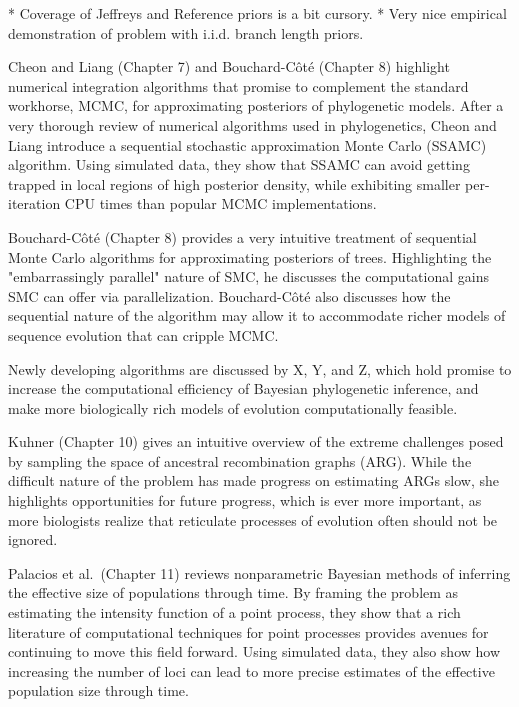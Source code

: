 \documentclass[letterpaper,12pt]{article}
\begin{document}
*   Coverage of Jeffreys and Reference priors is a bit cursory.
*   Very nice empirical demonstration of problem with i.i.d. branch length
    priors.




Cheon and Liang (Chapter 7) and Bouchard-C\^{o}t\'{e} (Chapter 8) highlight numerical
integration algorithms that promise to complement the standard workhorse, MCMC,
for approximating posteriors of phylogenetic models.
After a very thorough review of numerical algorithms used in phylogenetics,
Cheon and Liang introduce a sequential stochastic approximation Monte Carlo (SSAMC) \citep{Liang2007,Cheon2008}
algorithm.
Using simulated data, they show that SSAMC can avoid getting trapped in local
regions of high posterior density, while exhibiting smaller per-iteration CPU
times than popular MCMC implementations.

Bouchard-C\^{o}t\'{e} (Chapter 8) provides a very intuitive treatment of
sequential Monte Carlo algorithms for approximating posteriors of trees.
Highlighting the "embarrassingly parallel" nature of SMC, he discusses
the computational gains SMC can offer via parallelization.
Bouchard-C\^{o}t\'{e} also discusses how the sequential nature of the
algorithm may allow it to accommodate richer models of sequence evolution
that can cripple MCMC.

Newly developing algorithms are discussed by X, Y, and Z,
which hold promise to increase the computational efficiency of Bayesian
phylogenetic inference, and make more biologically rich models of evolution
computationally feasible.

Kuhner (Chapter 10) gives an intuitive overview of the extreme challenges
posed by sampling the space of ancestral recombination graphs (ARG).
While the difficult nature of the problem has made progress on estimating
ARGs slow, she highlights opportunities for future progress, which is ever more
important, as more biologists realize that reticulate processes of evolution
often should not be ignored.

Palacios et al.\ (Chapter 11) reviews nonparametric Bayesian methods of
inferring the effective size of populations through time. By framing
the problem as estimating the intensity function of a point process,
they show that a rich literature of computational techniques
for point processes provides avenues for continuing to move
this field forward.
Using simulated data, they also show how increasing the number
of loci can lead to more precise estimates of the effective
population size through time.
\end{document}
